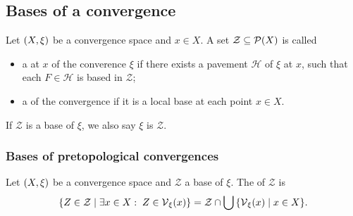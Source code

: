 \subsection{Bases of a convergence}
\begin{definition}
Let $\left( X,\xi \right)$ be a convergence space and $x\in X$. A set $\mathcal{Z}\subseteq \operatorname{\mathcal{P}}(X)$ is called
\begin{itemize}
\item a  at $x$ of the converence $\xi$ if there exists a pavement $\mathcal{H}$ of $\xi$ at $x$, such that each $F\in\mathcal{H}$ is based in $\mathcal{Z}$;
\item a  of the convergence if it is a local base at each point $x\in X$.
\end{itemize}
If $\mathcal{Z}$ is a base of $\xi$, we also say $\xi$ is  $\mathcal{Z}$.
\end{definition}


\subsubsection{Bases of pretopological convergences}
\begin{definition}
Let $\left( X,\xi \right)$ be a convergence space and $\mathcal{Z}$ a base of $\xi$. The  of $\mathcal{Z}$ is
\[ \setbuilder{Z\in \mathcal{Z}}{\exists x\in X: \; Z\in \vicinity_\xi(x)} = \mathcal{Z}\cap \bigcup\setbuilder{\vicinity_\xi(x)}{x\in X}. \]
\end{definition}

